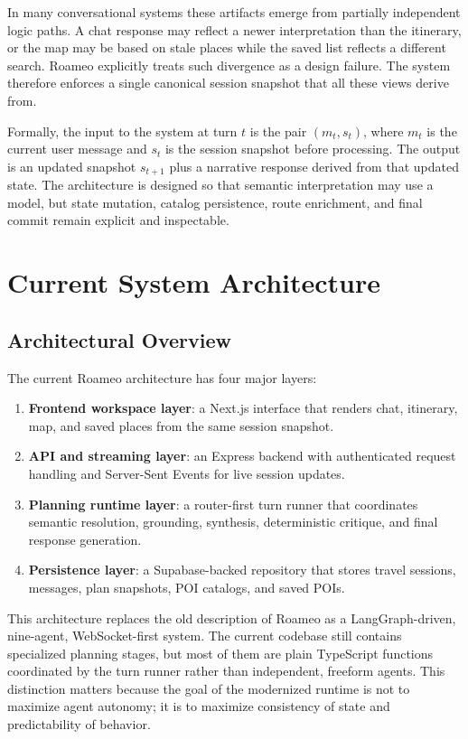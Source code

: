 \documentclass[conference]{IEEEtran}
\begin{document}
In many conversational systems these artifacts emerge from partially independent logic paths. A chat response may reflect a newer interpretation than the itinerary, or the map may be based on stale places while the saved list reflects a different search. Roameo explicitly treats such divergence as a design failure. The system therefore enforces a single canonical session snapshot that all these views derive from.

Formally, the input to the system at turn $t$ is the pair $(m_t, s_t)$, where $m_t$ is the current user message and $s_t$ is the session snapshot before processing. The output is an updated snapshot $s_{t+1}$ plus a narrative response derived from that updated state. The architecture is designed so that semantic interpretation may use a model, but state mutation, catalog persistence, route enrichment, and final commit remain explicit and inspectable.

\section{Current System Architecture}

\subsection{Architectural Overview}

The current Roameo architecture has four major layers:

\begin{enumerate}
  \item \textbf{Frontend workspace layer}: a Next.js interface that renders chat, itinerary, map, and saved places from the same session snapshot.
  \item \textbf{API and streaming layer}: an Express backend with authenticated request handling and Server-Sent Events for live session updates.
  \item \textbf{Planning runtime layer}: a router-first turn runner that coordinates semantic resolution, grounding, synthesis, deterministic critique, and final response generation.
  \item \textbf{Persistence layer}: a Supabase-backed repository that stores travel sessions, messages, plan snapshots, POI catalogs, and saved POIs.
\end{enumerate}

This architecture replaces the old description of Roameo as a LangGraph-driven, nine-agent, WebSocket-first system. The current codebase still contains specialized planning stages, but most of them are plain TypeScript functions coordinated by the turn runner rather than independent, freeform agents. This distinction matters because the goal of the modernized runtime is not to maximize agent autonomy; it is to maximize consistency of state and predictability of behavior.
\end{document}
